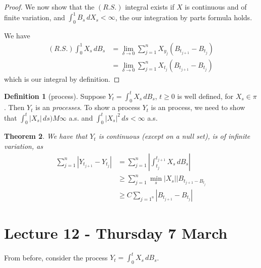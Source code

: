 \documentclass[10pt, oneside, reqno]{amsart}
\theoremstyle{plain}%
\newtheorem{thm}{Theorem}[section]
\theoremstyle{definition}
\newtheorem{defn}[thm]{Definition}
\theoremstyle{remark}
\begin{document}
\begin{proof}
    We now show that the $(R.S.)$ integral exists if $X$ is continuous and of finite variation, and $\int_0^1 B_s \, dX_s < \infty$, the our integration by parts formula holds.
    
      We have 
    \begin{align*}
        (R.S.) \int_0^1 X_s \, dB_s &= \lim_{\delta \rightarrow 0} \sum_{j=1}^n X_{y_j} (B_{t_{j+1}} - B_{t_j}) \\
        &= \lim_{\delta \rightarrow 0} \sum_{j=1}^n X_{t_j}  (B_{t_{j+1}} - B_{t_j})
    \end{align*} 
    which is our \ito integral by definition.
    
 \end{proof}

\begin{defn}[\ito process]
    Suppose $Y_t = \int_0^t X_s \, dB_s$, $t \geq 0$ is well defined, for $X_s \in \pi$. Then $Y_t$ is an \emph{\ito processes}.  To show a process $Y_t$ is an \ito process, we need to show that $\int_0^t |X_s| \, ds) M \infty$ a.s. and $\int_0^t |X_s|^2 \, ds < \infty$ a.s.
\end{defn}

\begin{thm}
    We have that $Y_t$ is continuous (except on a null set), is of infinite variation, as \begin{align*}
        \sum_{j=1}^n |Y_{t_{j+1}} - Y_{t_j} | &= \sum_{j=1}^n | \int_{t_j}^{t_{j+1}} X_s \, dB_s | \\
         &\geq  \sum_{j=1}^n \min_{s} |X_s| |B_{t_{j+1} - B_{t_j}} \\
        &\geq C \sum_{j=1^n} |B_{t_{j+1}} - B_{t_j} |
    \end{align*}
\end{thm}

\section{Lecture 12 - Thursday 7 March} %
\label{sec:lecture_12_thursday_7_march}
From before, consider the \ito process $Y_t = \int_0^t X_s \, dB_s$.  
\end{document}
